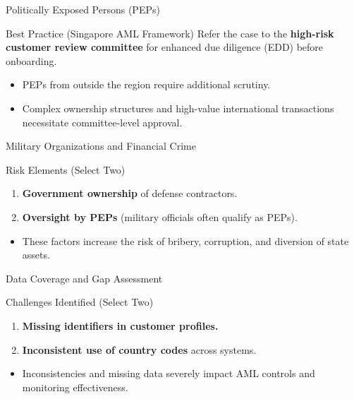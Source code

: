 \documentclass{beamer}
\begin{document}
	\begin{frame}{Politically Exposed Persons (PEPs)}
		\begin{block}{Best Practice (Singapore AML Framework)}
			Refer the case to the \textbf{high-risk customer review committee} for enhanced due diligence (EDD) before onboarding.
		\end{block}
		\begin{itemize}
			\item PEPs from outside the region require additional scrutiny.
			\item Complex ownership structures and high-value international transactions necessitate committee-level approval.
		\end{itemize}
	\end{frame}
	
	\begin{frame}{Military Organizations and Financial Crime}
		\begin{block}{Risk Elements (Select Two)}
			\begin{enumerate}
				\item \textbf{Government ownership} of defense contractors.
				\item \textbf{Oversight by PEPs} (military officials often qualify as PEPs).
			\end{enumerate}
		\end{block}
		\begin{itemize}
			\item These factors increase the risk of bribery, corruption, and diversion of state assets.
		\end{itemize}
	\end{frame}
	
	\begin{frame}{Data Coverage and Gap Assessment}
		\begin{block}{Challenges Identified (Select Two)}
			\begin{enumerate}
				\item \textbf{Missing identifiers in customer profiles.}
				\item \textbf{Inconsistent use of country codes} across systems.
			\end{enumerate}
		\end{block}
		\begin{itemize}
			\item Inconsistencies and missing data severely impact AML controls and monitoring effectiveness.
		\end{itemize}
	\end{frame}
	
\end{document}
